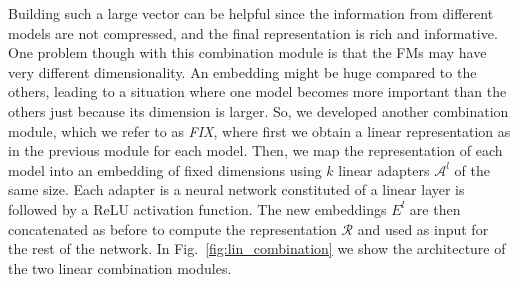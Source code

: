 Building such a large vector can be helpful since the information from different models are not compressed, and the final representation is rich and informative.
One problem though with this combination module is that the FMs may have very different dimensionality.
An embedding might be huge compared to the others, leading to a situation where one model becomes more important than the others just because its dimension is larger.
So, we developed another combination module, which we refer to as \textit{FIX}, where first we obtain a linear representation as in the previous module for each model.
Then, we map the representation of each model into an embedding of fixed dimensions using $k$ linear adapters $\mathcal{A}^{l}$ of the same size.
Each adapter is a neural network constituted of a linear layer is followed by a ReLU activation function.
The new embeddings $E^{l}$ are then concatenated as before to compute the representation $\mathcal{R}$ and used as input for the rest of the network.
In Fig.~\ref{fig:lin_combination} we show the architecture of the two linear combination modules.


